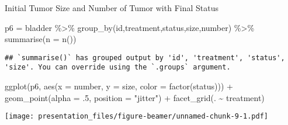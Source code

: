 \documentclass[
  ignorenonframetext,
]{beamer}
\newenvironment{Shaded}{\begin{snugshade}}{\end{snugshade}}
\newcommand{\AttributeTok}[1]{\textcolor[rgb]{0.77,0.63,0.00}{#1}}
\newcommand{\DecValTok}[1]{\textcolor[rgb]{0.00,0.00,0.81}{#1}}
\newcommand{\FunctionTok}[1]{\textcolor[rgb]{0.00,0.00,0.00}{#1}}
\newcommand{\NormalTok}[1]{#1}
\newcommand{\OtherTok}[1]{\textcolor[rgb]{0.56,0.35,0.01}{#1}}
\newcommand{\SpecialCharTok}[1]{\textcolor[rgb]{0.00,0.00,0.00}{#1}}
\newcommand{\StringTok}[1]{\textcolor[rgb]{0.31,0.60,0.02}{#1}}
\begin{document}
\begin{frame}[fragile]{Initial Tumor Size and Number of Tumor with Final
Status}
\protect\hypertarget{initial-tumor-size-and-number-of-tumor-with-final-status}{}
\begin{Shaded}
\begin{Highlighting}[]
\NormalTok{p6 }\OtherTok{=}\NormalTok{ bladder }\SpecialCharTok{\%\textgreater{}\%} \FunctionTok{group\_by}\NormalTok{(id,treatment,status,size,number) }\SpecialCharTok{\%\textgreater{}\%} \FunctionTok{summarise}\NormalTok{(}\AttributeTok{n =} \FunctionTok{n}\NormalTok{())}
\end{Highlighting}
\end{Shaded}

\begin{verbatim}
## `summarise()` has grouped output by 'id', 'treatment', 'status', 'size'. You can override using the `.groups` argument.
\end{verbatim}

\begin{Shaded}
\begin{Highlighting}[]
\FunctionTok{ggplot}\NormalTok{(p6, }\FunctionTok{aes}\NormalTok{(}\AttributeTok{x =}\NormalTok{ number, }\AttributeTok{y =}\NormalTok{ size, }\AttributeTok{color =} \FunctionTok{factor}\NormalTok{(status))) }\SpecialCharTok{+} 
  \FunctionTok{geom\_point}\NormalTok{(}\AttributeTok{alpha =}\NormalTok{ .}\DecValTok{5}\NormalTok{, }\AttributeTok{position =} \StringTok{"jitter"}\NormalTok{) }\SpecialCharTok{+} 
  \FunctionTok{facet\_grid}\NormalTok{(. }\SpecialCharTok{\textasciitilde{}}\NormalTok{ treatment)}
\end{Highlighting}
\end{Shaded}

\texttt{[image: presentation\_files/figure-beamer/unnamed-chunk-9-1.pdf]}
\end{frame}
\end{document}
